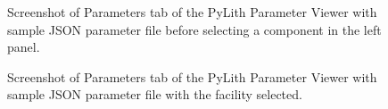 \begin{figure}[htbp]
  \caption{Screenshot of \textsf{Parameters} tab of the PyLith Parameter Viewer
    with sample JSON parameter file before selecting a component in the
    left panel.}
  \label{fig:parameters:gui:parameters:empty}
\end{figure}


\begin{figure}[htbp]
  \caption{Screenshot of \textsf{Parameters} tab of the PyLith Parameter Viewer
    with sample JSON parameter file with the  facility
    selected.}
  \label{fig:parameters:gui:parameters:selected} 
\end{figure}


